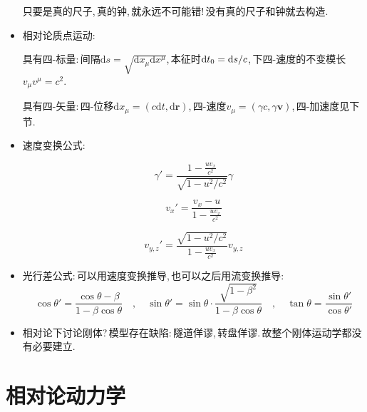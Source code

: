 \begin{itemize}
只要是真的尺子,\,真的钟,\,就永远不可能错!\,没有真的尺子和钟就去构造.

\item 相对论质点运动:

具有四-标量:\,间隔$\text{d}s=\sqrt{\text{d}x_{\mu}\text{d}x^{\mu}}$,\,本征时$\textrm{d} t_0=\textrm{d} s/c$,\,下四-速度的不变模长$v_\mu v^\mu=c^2$.

具有四-矢量:\,四-位移$\text{d}x_{\mu}=\left( c\text{d}t, \text{d}\boldsymbol{r} \right) $,\,四-速度$v_{\mu}=\left( \gamma c, \gamma \boldsymbol{v} \right) $,\,四-加速度见下节.

\item 速度变换公式:

$$
\gamma '=\frac{1-\frac{uv_x}{c^2}}{\sqrt{1-u^2/c^2}}\gamma 
$$

$$
v_x'=\frac{v_x-u}{1-\frac{uv_x}{c^2}}
$$

$$
v_{y,z}'=\frac{\sqrt{1-u^2/c^2}}{1-\frac{uv_x}{c^2}}v_{y,z}
$$

\item 光行差公式:\,可以用速度变换推导,\,也可以之后用流变换推导:
\[\cos \theta'=\frac{\cos \theta -\beta}{1-\beta \cos\theta}\quad ,\quad \sin \theta'=\sin\theta\cdot \frac{\sqrt{1-\beta^2}}{1-\beta \cos\theta}\quad ,\quad \tan\theta =\frac{\sin \theta'}{\cos \theta'}\]

\item 相对论下讨论刚体?\,模型存在缺陷:\,隧道佯谬,\,转盘佯谬.\,故整个刚体运动学都没有必要建立.

\end{itemize}

\section{相对论动力学}

